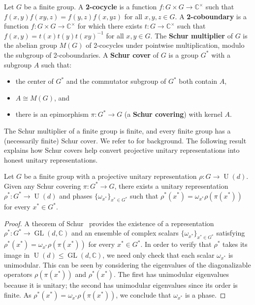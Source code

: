 \begin{definition}
Let $G$ be a finite group.
A \textbf{2-cocycle} is a function $f \colon G \times G \to \mathbb{C}^\times$ such that $f(x,y) f(xy,z) = f(y,z) f(x,yz)$ for all $x,y,z \in G$.
A \textbf{2-coboundary} is a function $f \colon G \times G \to \mathbb{C}^\times$ for which there exists $t \colon G \to \mathbb{C}^\times$ such that $f(x,y) = t(x)t(y)t(xy)^{-1}$ for all $x,y \in G$.
The \textbf{Schur multiplier} of $G$ is the abelian group $M(G)$ of 2-cocycles under pointwise multiplication, modulo the subgroup of 2-coboundaries. 
A \textbf{Schur cover} of $G$ is a group $G^*$ with a subgroup $A$ such that:
\begin{itemize}
\item[(i)] the center of $G^*$ and the commutator subgroup of $G^*$ both contain $A$,
\item[(ii)] $A \cong M(G)$, and
\item[(iii)] there is an epimorphism $\pi \colon G^* \to G$ (a \textbf{Schur covering}) with kernel $A$.
\end{itemize}
\end{definition}

The Schur multiplier of a finite group is finite, and every finite group has a (necessarily finite) Schur cover.
We refer to \cite{Karpilovsky:85,Karpilovsky:87} for background.
The following result explains how Schur covers help convert projective unitary representations into honest unitary representations.

\begin{proposition}
\label{prop: make honest}
Let $G$ be a finite group with a projective unitary representation $\rho \colon G \to \operatorname{U}(d)$.
Given any Schur covering $\pi \colon G^* \to G$, there exists a unitary representation $\rho^* \colon G^* \to \operatorname{U}(d)$ and phases $\{ \omega_{x^*} \}_{x^* \in G^*}$ such that $\rho^*(x^*) = \omega_{x^*} \rho(\pi(x^*))$ for every $x^* \in G^*$.
\end{proposition}

\begin{proof}
A theorem of Schur~\cite[Lemma~3.1]{Karpilovsky:85} provides the existence of a representation $\rho^* \colon G^* \to \operatorname{GL}(d,
\mathbb{C})$ and an ensemble of complex scalars $\{ \omega_{x^*} \}_{x^* \in G^*}$ satisfying $\rho^*(x^*) = \omega_{x^*} \rho( \pi( x^* ) )$ for every $x^* \in G^*$.
In order to verify that $\rho^*$ takes its image in $\operatorname{U}(d) \leq \operatorname{GL}(d,\mathbb{C})$, we need only check that each scalar $\omega_{x^*}$ is unimodular.
This can be seen by considering the eigenvalues of the diagonalizable operators $\rho( \pi( x^*) )$ and $\rho^* ( x^* )$.
The first has unimodular eigenvalues because it is unitary; the second has unimodular eigenvalues since its order is finite.
As $\rho^*(x^*) = \omega_{x^*} \rho( \pi( x^* ) )$, we conclude that $\omega_{x^*}$ is a phase.
\end{proof}



